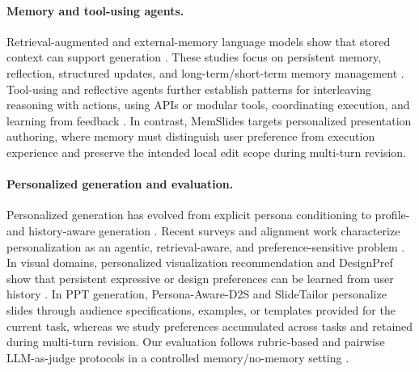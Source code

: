 \documentclass{llmxive}
\providecommand{\methodname}{MemSlides\xspace}
\begin{document}
\paragraph{Memory and tool-using agents.}
Retrieval-augmented and external-memory language models show that stored
context can support generation
\citep{lewis2020rag,guu2020realm,khandelwal2019knnlm,borgeaud2021retro,izacard2022atlas,wang2023longmem}.
These studies focus on
persistent memory, reflection, structured
updates, and long-term/short-term memory management
\citep{zhong2023memorybank,packer2023memgpt,park2023generativeagents,xu2025amem,chhikara2025mem0,wang2025mirix,kang2025memoryos,wu2025memoryage,yu2026agemem}.
Tool-using and reflective agents further establish patterns for interleaving
reasoning with actions, using APIs or modular tools, coordinating execution,
and learning from feedback
\citep{yao2023react,shinn2023reflexion,schick2023toolformer,patil2023gorilla,qin2023toolllm,li2023apibank,karpas2022mrkl,wu2023autogen,wang2023voyager,madaan2023selfrefine,nakano2021webgpt,ahn2022saycan,wang2022selfconsistency,yao2023treeofthoughts,hu2026agentictooluse}.
In contrast, \methodname targets personalized presentation authoring, where
memory must distinguish user preference from execution experience and preserve
the intended local edit scope during multi-turn revision.

\paragraph{Personalized generation and evaluation.}
Personalized generation has evolved from explicit persona conditioning to
profile- and history-aware generation
\citep{li2016persona,wu2021splitmemory,salemi2023lamp,mysore2023pearl,jiang2025personamem}.
Recent surveys and alignment work characterize personalization as an agentic,
retrieval-aware, and preference-sensitive problem
\citep{zhang2024personalizationllm,li2025personalizationragagent}. In visual
domains, personalized visualization recommendation and DesignPref show that
persistent expressive or design preferences can be learned from user history
\citep{qian2022personalizedvis,peng2025designpref}. In PPT generation,
Persona-Aware-D2S and SlideTailor personalize slides through audience
specifications, examples, or templates provided for the current task, whereas
we study preferences accumulated across tasks and retained during multi-turn
revision. Our evaluation follows rubric-based and pairwise LLM-as-judge
protocols in a controlled memory/no-memory setting
\citep{liu2023geval,zheng2023llmasjudge,kim2023prometheus,zhu2023judgelm,li2024arenahard}.
\end{document}
